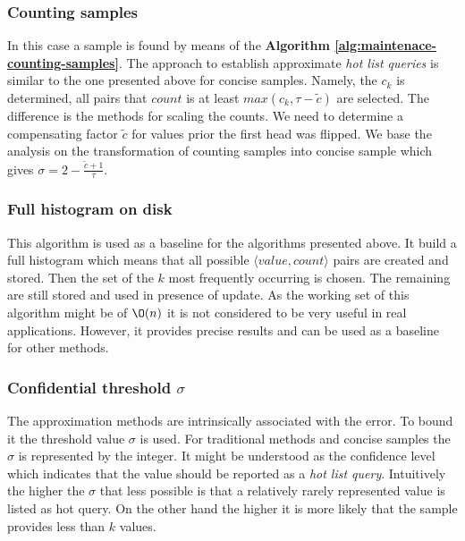 \subsubsection{Counting samples}
In this case a sample is found by means of the \textbf{Algorithm
  \ref{alg:maintenace-counting-samples}}. The approach to establish
approximate \textit{hot list queries} is similar to the
one presented above for concise samples. Namely, the $c_k$ is
determined, all pairs that $count$ is at least $max(c_k, \tau - \widetilde{c})$ are
selected. The difference is the methods for scaling the counts.
We need to determine a compensating factor $\widetilde{c}$ for values
prior the first head was flipped. We base the analysis on the
transformation of counting samples into concise sample which gives
$\sigma = 2 - \frac{\widetilde{c}+1}{\tau}$.


\subsubsection{Full histogram on disk}
This algorithm is used as a baseline for the algorithms presented
above. It build a full histogram which means that all possible
$\langle value, count \rangle$ pairs are created and stored. Then the
set of the $k$ most frequently occurring is chosen. The remaining are
still stored and used in presence of update. As the working set of
this algorithm might be of $\O(n)$ it is not considered to be
very useful in real applications. However, it provides precise results
and can be used as a baseline for other methods.

\subsubsection{Confidential threshold $\sigma$}
The approximation methods are intrinsically associated with the
error. To bound it the threshold value $\sigma$ is used. For
traditional methods and concise samples the $\sigma$ is represented by
the integer. It might be understood as the confidence level which
indicates that the value should be reported as a \textit{hot list
  query}. Intuitively the higher the $\sigma$ that less possible is
that a relatively rarely represented value is listed as hot query. On
the other hand the higher it is more likely that the sample provides
less than $k$ values.

